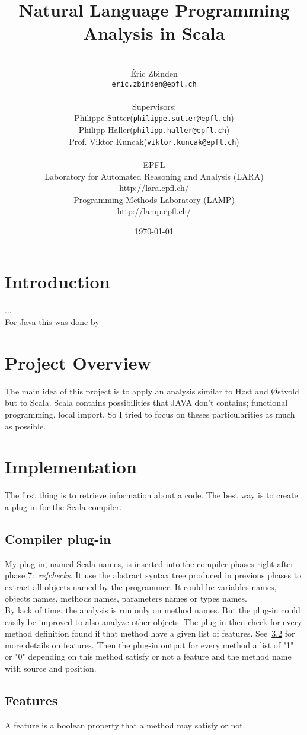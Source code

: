 \documentclass[12pt]{article}
\title{Natural Language Programming Analysis in Scala}
\author{\\ \'Eric Zbinden \\ \texttt{eric.zbinden@epfl.ch} \\ \\ Supervisors: \\Philippe Sutter(\texttt{philippe.sutter@epfl.ch})\\ Philipp Haller(\texttt{philipp.haller@epfl.ch})\\Prof. Viktor Kuncak(\texttt{viktor.kuncak@epfl.ch}) \\ \\ EPFL\\ Laboratory for Automated Reasoning and Analysis (LARA) \\ \url{http://lara.epfl.ch/}\\ Programming Methods Laboratory (LAMP) \\ \url{http://lamp.epfl.ch/} }
\date{\today}
\begin{document}
\maketitle
\newpage
\tableofcontents
\newpage

\section{Introduction}
...\\
For Java this was done by  

\section {Project Overview}
The main idea of this project is to apply an analysis similar to H{\o}st and {\O}stvold~\cite{DebugMN} but to Scala. Scala contains possibilities that JAVA don't contains; functional programming, local import. So I tried to focus on theses particularities as much as possible.

\section {Implementation}
The first thing is to retrieve information about a code. The best way is to create a plug-in for the Scala compiler. 

\subsection{Compiler plug-in}
My plug-in, named Scala-names, is inserted into the compiler phases right after phase 7:~\textit{refchecks}. It use the abstract syntax tree produced in previous phases to extract all objects named by the programmer. It could be variables names, objects names, methods names, parameters names or types names.\\

By lack of time, the analysis is run only on method names. But the plug-in could easily be improved to also analyze other objects.
The plug-in then check for every method definition found if that method have a given list of features. See~\ref{fs} for more details on features. Then the plug-in output for every method a list of "1" or "0" depending on this method satisfy or not a feature and the method name with source and position.

\subsection{Features}
\label{fs}
A feature is a boolean property that a method may satisfy or not. 
\end{document}
